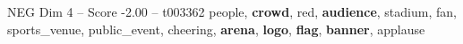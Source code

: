 \begin{textsample}{NEG Dim 4 – Score -2.00 – t003362}  \label{ex:f4_neg_019}
people, \textbf{crowd}, red, \textbf{audience}, stadium, fan, sports\_venue, public\_event, cheering, \textbf{arena}, \textbf{logo}, \textbf{flag}, \textbf{banner}, applause

\end{textsample}

